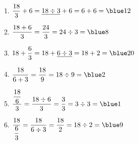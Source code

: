    \ \\ [-5mm]
   \begin{enumerate}
      \item $\dfrac{18}{3}+6 =\underline{18\div3}+6 =6+6 =\blue 12$ \smallskip
      \item $\dfrac{18+6}{3} =\dfrac{24}{3} =24\div3 =\blue 8$ \smallskip
      \item $18+\dfrac{6}{3} =18+\underline{6\div3} =18+2 =\blue 20$ \smallskip
      \item $\dfrac{18}{6+3} =\dfrac{18}{9} =18\div9 =\blue 2$ \smallskip
      \item $\dfrac{\dfrac{18}{6}}{3} =\dfrac{18\div6}{3} =\dfrac{3}{3} =3\div3 =\blue 1$ \smallskip
      \item $\dfrac{18}{\dfrac{6}{3}} =\dfrac{18}{6\div3} =\dfrac{18}{2} =18\div2 =\blue 9$
   \end{enumerate}
